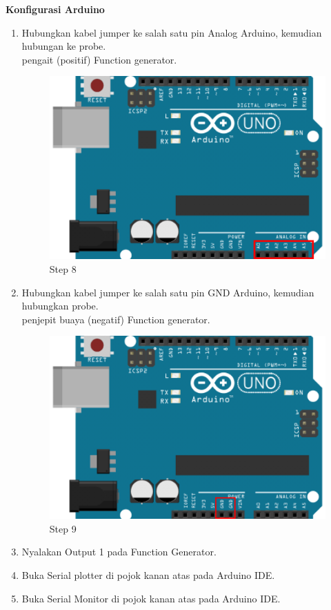 \begin{center}
	\textbf{Konfigurasi Arduino}
	\begin{enumerate}
		\item Hubungkan kabel jumper ke salah satu pin Analog Arduino, kemudian hubungan ke probe.
		\\pengait (positif) Function generator.
		\begin{figure}[H]
			\centering
			\includegraphics[width=0.8\linewidth]{P4/img/per1/step 8.png}
			\caption{Step 8}
			\label{fig:Step 8(Step 8)}
		\end{figure}

		\item Hubungkan kabel jumper ke salah satu pin GND Arduino, kemudian hubungkan probe.
		\\penjepit buaya (negatif) Function generator.
		\begin{figure}[H]
			\centering
			\includegraphics[width=0.8\linewidth]{P4/img/per1/step 9.png}
			\caption{Step 9}
			\label{fig:Step 9(Step 9)}
		\end{figure}

		\item Nyalakan Output 1 pada Function Generator.
		\item Buka Serial plotter di pojok kanan atas pada Arduino IDE.
		\item Buka Serial Monitor di pojok kanan atas pada Arduino IDE.
	\end{enumerate}

\end{center}

